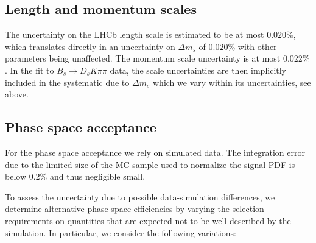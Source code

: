 \subsection{Length and momentum scales}
The uncertainty on the LHCb length scale is estimated to be at most $0.020\%$\cite{LHCb-ANA-2012-053,LHCb-PAPER-2013-006}, which translates
directly in an uncertainty on $\Delta m_s$ of $0.020\%$ with other parameters being unaffected.
The momentum scale uncertainty is at most $0.022\%$.
In the fit to  $B_s \to D_s K \pi\pi$ data, the scale uncertainties are then implicitly included in the systematic due to $\Delta m_s$ which we 
vary within its uncertainties, see above.

\subsection{Phase space acceptance}
\label{sec:SysPhspAcc}

For the phase space acceptance we rely on simulated data.
The integration error due to the limited size of the MC sample 
used to normalize the signal PDF is below $0.2\%$ and thus negligible small.

To assess the uncertainty due to possible data-simulation differences, we determine
alternative phase space efficiencies by varying the selection requirements on quantities that
are expected not to be well described by the simulation. 
In particular, we consider the following variations:

